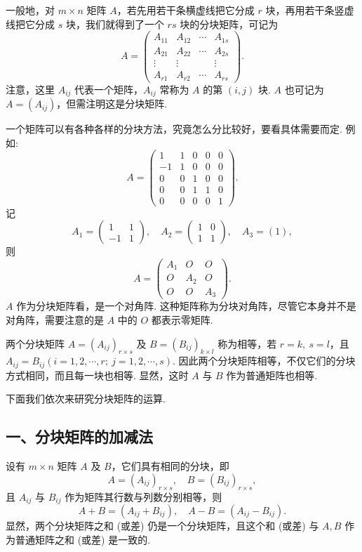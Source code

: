 \documentclass[UTF8,12pt,a4paper,fontset=fandol]{ctexart}
\begin{document}
一般地，对 $m\times n$ 矩阵 $A$，若先用若干条横虚线把它分成 $r$ 块，再用若干条竖虚线把它分成 $s$ 块，我们就得到了一个 $rs$ 块的分块矩阵，可记为
\[
A=\left(\begin{array}{cccc}
A_{11} & A_{12} & \cdots & A_{1s}\\
A_{21} & A_{22} & \cdots & A_{2s}\\
\vdots & \vdots & & \vdots\\
A_{r1} & A_{r2} & \cdots & A_{rs}
\end{array}\right).
\]
注意，这里 $A_{ij}$ 代表一个矩阵，$A_{ij}$ 常称为 $A$ 的第 $(i,j)$ 块. $A$ 也可记为 $A=(A_{ij})$，但需注明这是分块矩阵.

一个矩阵可以有各种各样的分块方法，究竟怎么分比较好，要看具体需要而定. 例如:
\[
A=\left(\begin{array}{cc|cc|c}
1 & 1 & 0 & 0 & 0\\
-1 & 1 & 0 & 0 & 0\\ \hline
0 & 0 & 1 & 0 & 0\\
0 & 0 & 1 & 1 & 0\\ \hline
0 & 0 & 0 & 0 & 1
\end{array}\right).
\]
记
\[
A_1=\left(\begin{array}{rr}
1 & 1\\
-1 & 1
\end{array}\right),\quad
A_2=\left(\begin{array}{rr}
1 & 0\\
1 & 1
\end{array}\right),\quad A_3=(1),
\]
则
\[
A=\left(\begin{array}{ccc}
A_1 & O & O\\
O & A_2 & O\\
O & O & A_3
\end{array}\right).
\]
$A$ 作为分块矩阵看，是一个对角阵. 这种矩阵称为分块对角阵，尽管它本身并不是对角阵，需要注意的是 $A$ 中的 $O$ 都表示零矩阵.

两个分块矩阵 $A=(A_{ij})_{r\times s}$ 及 $B=(B_{ij})_{k\times l}$ 称为相等，若 $r=k,\ s=l$，且 $A_{ij}=B_{ij}(i=1,2,\cdots,r;\ j=1,2,\cdots,s)$. 因此两个分块矩阵相等，不仅它们的分块方式相同，而且每一块也相等. 显然，这时 $A$ 与 $B$ 作为普通矩阵也相等.

下面我们依次来研究分块矩阵的运算.

\subsection*{一、分块矩阵的加减法}

设有 $m\times n$ 矩阵 $A$ 及 $B$，它们具有相同的分块，即
\[
A=(A_{ij})_{r\times s},\quad B=(B_{ij})_{r\times s},
\]
且 $A_{ij}$ 与 $B_{ij}$ 作为矩阵其行数与列数分别相等，则
\[
A+B=(A_{ij}+B_{ij}),\quad A-B=(A_{ij}-B_{ij}).
\]
显然，两个分块矩阵之和 (或差) 仍是一个分块矩阵，且这个和 (或差) 与 $A,B$ 作为普通矩阵之和 (或差) 是一致的.
\end{document}
